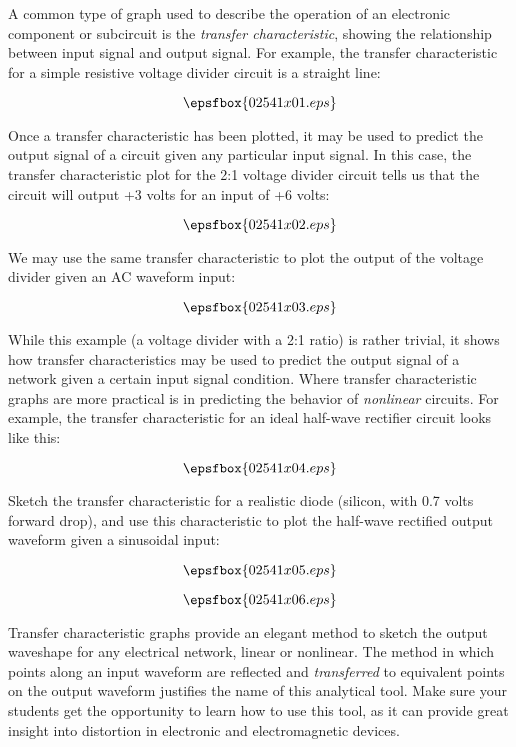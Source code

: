 

A common type of graph used to describe the operation of an electronic component or subcircuit is the {\it transfer characteristic}, showing the relationship between input signal and output signal.  For example, the transfer characteristic for a simple resistive voltage divider circuit is a straight line:

$$\epsfbox{02541x01.eps}$$

Once a transfer characteristic has been plotted, it may be used to predict the output signal of a circuit given any particular input signal.  In this case, the transfer characteristic plot for the 2:1 voltage divider circuit tells us that the circuit will output +3 volts for an input of +6 volts:

$$\epsfbox{02541x02.eps}$$

We may use the same transfer characteristic to plot the output of the voltage divider given an AC waveform input:

$$\epsfbox{02541x03.eps}$$

While this example (a voltage divider with a 2:1 ratio) is rather trivial, it shows how transfer characteristics may be used to predict the output signal of a network given a certain input signal condition.  Where transfer characteristic graphs are more practical is in predicting the behavior of {\it nonlinear} circuits.  For example, the transfer characteristic for an ideal half-wave rectifier circuit looks like this:

$$\epsfbox{02541x04.eps}$$

Sketch the transfer characteristic for a realistic diode (silicon, with 0.7 volts forward drop), and use this characteristic to plot the half-wave rectified output waveform given a sinusoidal input:

$$\epsfbox{02541x05.eps}$$







$$\epsfbox{02541x06.eps}$$







Transfer characteristic graphs provide an elegant method to sketch the output waveshape for any electrical network, linear or nonlinear.  The method in which points along an input waveform are reflected and {\it transferred} to equivalent points on the output waveform justifies the name of this analytical tool.  Make sure your students get the opportunity to learn how to use this tool, as it can provide great insight into distortion in electronic and electromagnetic devices.




